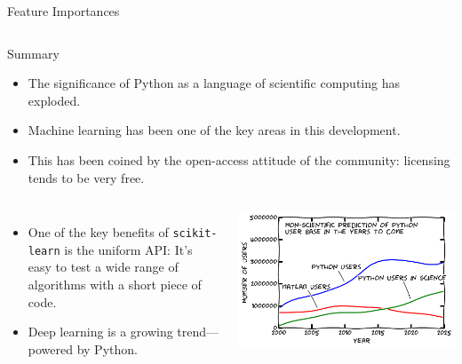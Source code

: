 \documentclass[10pt, aspectratio=169]{beamer} %
\begin{document}
\begin{frame}[fragile]{Feature Importances}
\begin{columns}
\end{columns}
\end{frame}


\begin{frame}[fragile]{Summary}
\begin{itemize}
\item The significance of Python as a language of scientific computing has exploded.
\item Machine learning has been one of the key areas in this development.
\item This has been coined by the open-access attitude of the community: licensing 
tends to be very free.
\end{itemize}
\begin{columns}
\vspace*{-0.3cm}
\begin{itemize}
\item One of the key benefits of \verb+scikit-learn+ is the uniform API:
It's easy to test a wide range of algorithms with a short piece of code.
\item Deep learning is a growing trend---powered by Python.
\end{itemize}
\hspace*{-1cm}
\includegraphics[width = 1.3\columnwidth]{user_prediction.pdf}
\end{columns}
\end{frame}
\end{document}
